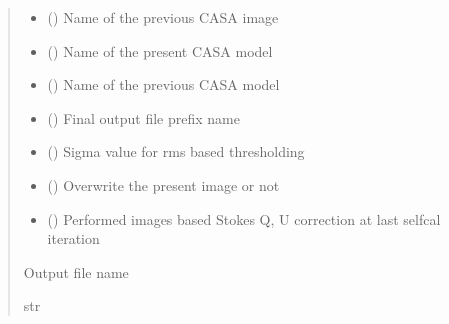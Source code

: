\documentclass[letterpaper,10pt,english]{sphinxmanual}
\begin{document}
\begin{fulllineitems}
\begin{fulllineitems}
\begin{quote}
\begin{description}
\begin{itemize}
\item {} 
\sphinxAtStartPar
{} () \textendash{} Name of the previous CASA image

\item {} 
\sphinxAtStartPar
{} () \textendash{} Name of the present CASA model

\item {} 
\sphinxAtStartPar
{} () \textendash{} Name of the previous CASA model

\item {} 
\sphinxAtStartPar
{} () \textendash{} Final output file prefix name

\item {} 
\sphinxAtStartPar
{} () \textendash{} Sigma value for rms based thresholding

\item {} 
\sphinxAtStartPar
{} () \textendash{} Overwrite the present image or not

\item {} 
\sphinxAtStartPar
{} () \textendash{} Performed images based Stokes Q, U correction at last selfcal iteration

\end{itemize}

\item[{Returns}] \leavevmode
\sphinxAtStartPar
Output file name

\item[{Return type}] \leavevmode
\sphinxAtStartPar
str

\end{description}\end{quote}

\end{fulllineitems}



\end{fulllineitems}
\end{document}
